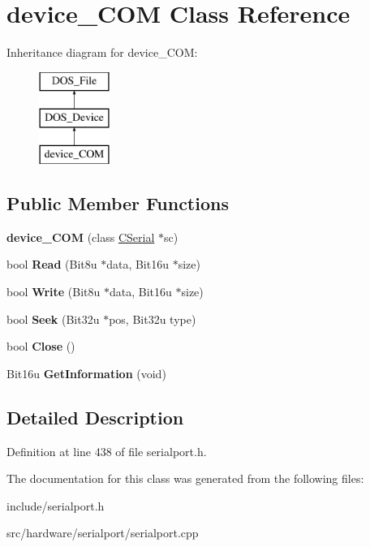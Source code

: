 \hypertarget{classdevice__COM}{\section{device\-\_\-\-C\-O\-M Class Reference}
\label{classdevice__COM}
}
Inheritance diagram for device\-\_\-\-C\-O\-M\-:\begin{figure}[H]
\begin{center}
\leavevmode
\includegraphics[height=3.000000cm]{classdevice__COM}
\end{center}
\end{figure}
\subsection*{Public Member Functions}
\begin{DoxyCompactItemize}
\item 
\hypertarget{classdevice__COM_a27121b64d7af922b43f2a440845f5f30}{{\bfseries device\-\_\-\-C\-O\-M} (class \hyperlink{classCSerial}{C\-Serial} $\ast$sc)}\label{classdevice__COM_a27121b64d7af922b43f2a440845f5f30}

\item 
\hypertarget{classdevice__COM_a1c1ae4216213b38d8df250b8a620d11d}{bool {\bfseries Read} (Bit8u $\ast$data, Bit16u $\ast$size)}\label{classdevice__COM_a1c1ae4216213b38d8df250b8a620d11d}

\item 
\hypertarget{classdevice__COM_a16ddf3df022d68a34db573f8f11ea5a3}{bool {\bfseries Write} (Bit8u $\ast$data, Bit16u $\ast$size)}\label{classdevice__COM_a16ddf3df022d68a34db573f8f11ea5a3}

\item 
\hypertarget{classdevice__COM_a6532f789b0eb77a8d821b7ebc8923edc}{bool {\bfseries Seek} (Bit32u $\ast$pos, Bit32u type)}\label{classdevice__COM_a6532f789b0eb77a8d821b7ebc8923edc}

\item 
\hypertarget{classdevice__COM_a5d00c77725eba731dc7d766d2746ccd3}{bool {\bfseries Close} ()}\label{classdevice__COM_a5d00c77725eba731dc7d766d2746ccd3}

\item 
\hypertarget{classdevice__COM_a0f83ae83d1102e5191189983a18e8766}{Bit16u {\bfseries Get\-Information} (void)}\label{classdevice__COM_a0f83ae83d1102e5191189983a18e8766}

\end{DoxyCompactItemize}


\subsection{Detailed Description}


Definition at line 438 of file serialport.\-h.



The documentation for this class was generated from the following files\-:\begin{DoxyCompactItemize}
\item 
include/serialport.\-h\item 
src/hardware/serialport/serialport.\-cpp\end{DoxyCompactItemize}
